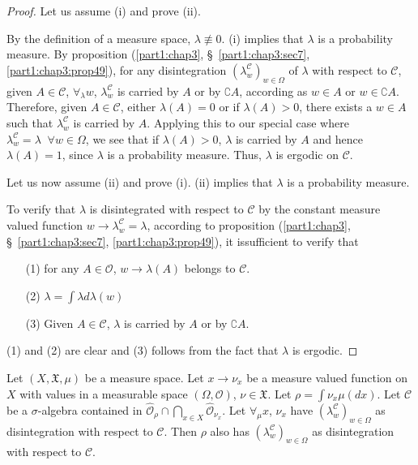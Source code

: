 \begin{proof}
Let us assume (i) and prove (ii). 

By the definition of a measure space, $\lambda \not\equiv 0$. (i)
implies that $\lambda$ is a probability measure. By proposition (\ref{part1:chap3},
\S\ \ref{part1:chap3:sec7}, \ref{part1:chap3:prop49}), for any
disintegration $(\lambda^\mathscr{C}_w)_{w \in 
  \Omega}$ of $\lambda$ with respect to $\mathscr{C}$, given $A \in
\mathscr{C}$, $\forall_\lambda w$, $\lambda^\mathscr{C}_w$ is carried
by $A$ or by $\complement A$, according as $w \in A$ or $w \in
\complement A$. Therefore, given $A \in \mathscr{C}$, either
$\lambda(A) = 0$ or if $\lambda(A) >0$, there exists a $w \in A$ such
that $\lambda^\mathscr{C}_w$ is carried by $A$. Applying this to our
special case where $\lambda^\mathscr{C}_w = \lambda \;\; \forall w \in
\Omega$, we see that if $\lambda(A) >0$, $\lambda$ is carried by $A$
and hence $\lambda(A) =1$, since $\lambda$ is a probability
measure. Thus, $\lambda$ is ergodic on $\mathscr{C}$.

Let us now assume (ii) and prove (i). (ii) implies that $\lambda$ is a
probability measure.

To verify that $\lambda$ is disintegrated with respect to
$\mathscr{C}$ by the constant measure valued function $w \to
\lambda^\mathscr{C}_w = \lambda$, according to proposition (\ref{part1:chap3},
\S\ \ref{part1:chap3:sec7}, \ref{part1:chap3:prop49}), it
is\pageoriginale sufficient to verify that 
\begin{itemize}
\item[{\rm (1)}] for any $A \in \mathscr{O}$, $w \to \lambda(A)$
  belongs to $\mathscr{C}$. 

\item[{\rm (2)}] $\lambda = \int \lambda d \lambda(w)$

\item[{\rm (3)}] Given $A \in \mathscr{C}$, $\lambda$ is carried by
  $A$ or by $\complement A$.
\end{itemize}
(1) and (2) are clear and (3) follows from the fact that $\lambda$ is
ergodic. 
\end{proof}

\begin{proposition}\label{part2:chap7:prop96}
Let $(X, \mathfrak{X}, \mu)$ be a measure space. Let $x \to \nu_x$ be
a measure valued function on $X$ with values in a measurable space
$(\Omega, \mathscr{O})$, $\nu \in \mathfrak{X}$. Let $\rho = \int
\nu_x \mu(dx)$. Let $\mathscr{C}$ be a $\sigma$-algebra contained in
$\hat{\mathscr{O}}_\rho \cap \bigcap\limits_{x \in X}
\hat{\mathscr{O}}_{\nu_x}$. Let $\forall_\mu x$, $\nu_x$ have
$(\lambda^\mathscr{C}_w)_{w \in \Omega}$  as disintegration with
respect to $\mathscr{C}$. Then $\rho$ also has
$(\lambda^\mathscr{C}_w)_{w \in \Omega}$ as disintegration with
respect to $\mathscr{C}$.
\end{proposition}

